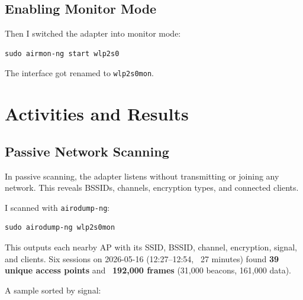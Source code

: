 \documentclass[12pt,a4paper]{article}
\begin{document}
\subsection{Enabling Monitor Mode}

Then I switched the adapter into monitor mode:

\begin{lstlisting}
sudo airmon-ng start wlp2s0
\end{lstlisting}

The interface got renamed to \texttt{wlp2s0mon}.

\section{Activities and Results}

\subsection{Passive Network Scanning}

In passive scanning, the adapter listens without transmitting or joining any network. This reveals BSSIDs, channels, encryption types, and connected clients.

I scanned with \texttt{airodump-ng}:

\begin{lstlisting}
sudo airodump-ng wlp2s0mon
\end{lstlisting}

This outputs each nearby AP with its SSID, BSSID, channel, encryption, signal, and clients. Six sessions on 2026-05-16 (12:27--12:54, ~27 minutes) found \textbf{39 unique access points} and ~\textbf{192,000 frames} (31,000 beacons, 161,000 data).

A sample sorted by signal:
\end{document}
